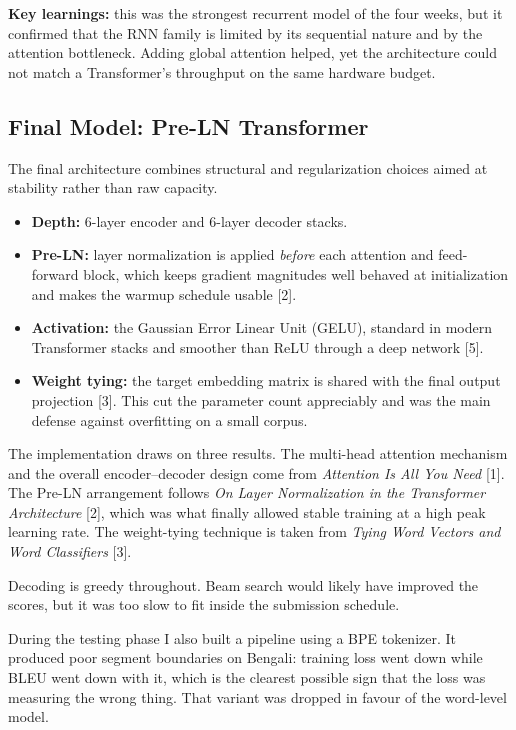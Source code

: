 \documentclass[11pt, oneside]{article}
\begin{document}
\textbf{Key learnings:} this was the strongest recurrent model of the four weeks, but it
confirmed that the RNN family is limited by its sequential nature and by the attention
bottleneck. Adding global attention helped, yet the architecture could not match a
Transformer's throughput on the same hardware budget.

\subsection{Final Model: Pre-LN Transformer}

The final architecture combines structural and regularization choices aimed at stability
rather than raw capacity.

\begin{itemize}
    \item \textbf{Depth:} 6-layer encoder and 6-layer decoder stacks.
    \item \textbf{Pre-LN:} layer normalization is applied \emph{before} each attention and
          feed-forward block, which keeps gradient magnitudes well behaved at initialization
          and makes the warmup schedule usable [2].
    \item \textbf{Activation:} the Gaussian Error Linear Unit (GELU), standard in modern
          Transformer stacks and smoother than ReLU through a deep network [5].
    \item \textbf{Weight tying:} the target embedding matrix is shared with the final output
          projection [3]. This cut the parameter count appreciably and was the main defense
          against overfitting on a small corpus.
\end{itemize}

The implementation draws on three results. The multi-head attention mechanism and the overall
encoder--decoder design come from \emph{Attention Is All You Need} [1]. The Pre-LN
arrangement follows \emph{On Layer Normalization in the Transformer Architecture} [2], which
was what finally allowed stable training at a high peak learning rate. The weight-tying
technique is taken from \emph{Tying Word Vectors and Word Classifiers} [3].

Decoding is greedy throughout. Beam search would likely have improved the scores, but it was
too slow to fit inside the submission schedule.

During the testing phase I also built a pipeline using a BPE tokenizer. It produced poor
segment boundaries on Bengali: training loss went down while BLEU went down with it, which is
the clearest possible sign that the loss was measuring the wrong thing. That variant was
dropped in favour of the word-level model.
\end{document}
